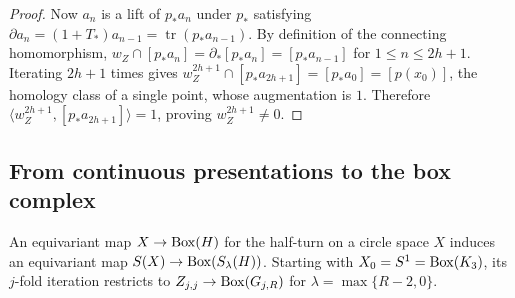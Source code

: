 \begin{proof}
Now $a_n$ is a lift of $p_*a_n$ under $p_*$ satisfying $\partial a_n=(1+T_*)a_{n-1}=\operatorname{tr}(p_*a_{n-1})$. By definition of the connecting homomorphism, $w_Z\cap[p_*a_n]=\partial_*[p_*a_n]=[p_*a_{n-1}]$ for $1\le n\le 2h+1$. Iterating $2h+1$ times gives $w_Z^{2h+1}\cap[p_*a_{2h+1}]=[p_*a_0]=[p(x_0)]$, the homology class of a single point, whose augmentation is $1$. Therefore $\langle w_Z^{2h+1},[p_*a_{2h+1}]\rangle=1$, proving $w_Z^{2h+1}\ne0$.
\end{proof}

\subsection{From continuous presentations to the box complex}\label{app:box-real}

\begin{lemma}\label{lem:box-realization}
An equivariant map $X\to\operatorname{Box}(H)$ for the half-turn on a circle space $X$ induces an equivariant map $S(X)\to\operatorname{Box}(S_\lambda(H))$. Starting with $X_0=S^1=\operatorname{Box}(K_3)$, its $j$-fold iteration restricts to $Z_{j,j}\to\operatorname{Box}(G_{j,R})$ for $\lambda=\max\{R-2,0\}$.
\end{lemma}
